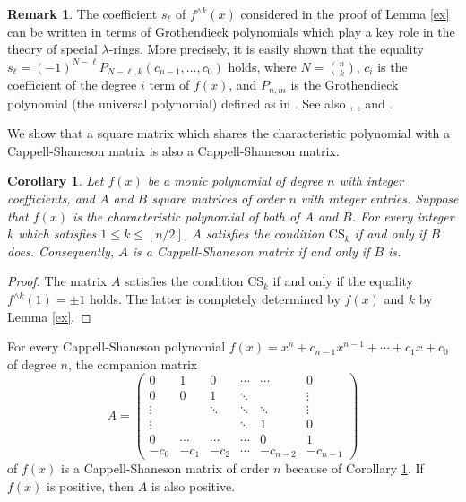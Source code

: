 \documentclass{amsart}
\theoremstyle{plain}
\newtheorem{cor}[thm]{Corollary}
\theoremstyle{definition}
\newtheorem{rem}[thm]{Remark}
\theoremstyle{remark}
\newcommand{\cb}{}
\begin{document}
\begin{rem}
The coefficient $s_{\ell}$ of $f^{\wedge k}(x)$ considered in the proof of Lemma \ref{ex} 
can be written in terms of Grothendieck polynomials which play a key role in the theory of 
special $\lambda$-rings. More precisely, it is easily shown that the equality 
$s_{\ell}=(-1)^{N-\ell}P_{N-\ell,k}(c_{n-1},\ldots ,c_0)$ holds, where $N=\binom{n}{k}$, 
$c_i$ is the coefficient of the degree $i$ term of $f(x)$, and $P_{n,m}$ is the Grothendieck polynomial 
(the universal polynomial) defined as in \cite{AT1969}. 
See also \cite{Grothendieck1958}, \cite{Knutson1973}, and 
\cite{Yau2010}. 
\end{rem}

We show that a square matrix which shares the characteristic polynomial with a Cappell-Shaneson 
matrix is also a Cappell-Shaneson matrix. 

\begin{cor}\label{CSCS}
Let $f(x)$ be a monic polynomial of degree $n$ with integer coefficients, 
and $A$ and $B$ square matrices of order $n$ with integer entries. 
Suppose that $f(x)$ is the characteristic polynomial of both of $A$ and $B$. 
For every  integer $k$ which satisfies $1\leq k\leq [n/2]$, 
$A$ satisfies the condition $\mathrm{CS}_k$ if and only if $B$ does. 
Consequently, $A$ is a Cappell-Shaneson matrix if and only if $B$ is. 
\end{cor}

\begin{proof}
The matrix $A$ satisfies the condition $\mathrm{CS}_k$ if and only if the equality
{\cb
$f^{\wedge k}(1)=\pm 1$
}
holds.
The latter is completely determined by $f(x)$ and $k$ by Lemma \ref{ex}. 
\end{proof}

For every Cappell-Shaneson polynomial $f(x)=x^n+c_{n-1}x^{n-1}+\cdots +c_1x+c_0$ of degree $n$, 
the companion matrix 
\[
A
=
\left(
\begin{array}{cccccc}
0 & 1 & 0 & \cdots & \cdots & 0 \\
0 & 0 & 1 & \ddots &  & \vdots \\
\vdots &  & \ddots & \ddots & \ddots & \vdots \\
\vdots &  &  & \ddots & 1 & 0 \\
0 & \cdots & \cdots & \cdots & 0 & 1 \\
-c_0 & -c_1 & -c_2 & \cdots & -c_{n-2} & -c_{n-1}
\end{array}
\right)
\]
of $f(x)$ is a Cappell-Shaneson matrix of order $n$ because of Corollary \ref{CSCS}. 
If $f(x)$ is positive, then $A$ is also positive. 
\end{document}
